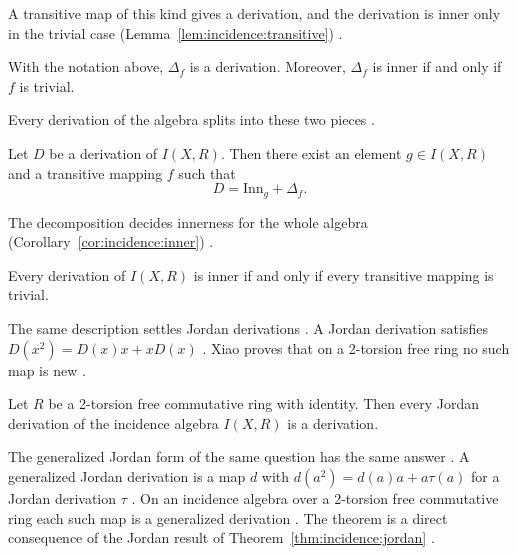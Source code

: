 A transitive map of this kind gives a derivation, and the derivation is inner only
in the trivial case (Lemma~\ref{lem:incidence:transitive}) \cite[p.~1362]{Xiao2015}.

\begin{lemma}\label{lem:incidence:transitive}
With the notation above, $\Delta_{f}$ is a derivation. Moreover, $\Delta_{f}$ is
inner if and only if $f$ is trivial.
\end{lemma}

Every derivation of the algebra splits into these two pieces
\cite[p.~1362]{Xiao2015}.

\begin{proposition}\label{prop:incidence:split}
Let $D$ be a derivation of $I(X,R)$. Then there exist an element $g\in I(X,R)$ and a
transitive mapping $f$ such that
\begin{equation*}
D=\mathrm{Inn}_{g}+\Delta_{f}.
\end{equation*}
\end{proposition}

The decomposition decides innerness for the whole algebra (Corollary~\ref{cor:incidence:inner})
\cite[p.~1363]{Xiao2015}.\begin{corollary}\label{cor:incidence:inner}
Every derivation of $I(X,R)$ is inner if and only if every transitive mapping is
trivial.
\end{corollary}

The same description settles Jordan derivations \cite[p.~1364]{Xiao2015}. A Jordan
derivation satisfies $D(x^{2})=D(x)x+xD(x)$ \cite[p.~1357]{Xiao2015}. Xiao proves
that on a 2-torsion free ring no such map is new \cite[p.~1366]{Xiao2015}.

\begin{theorem}\label{thm:incidence:jordan}
Let $R$ be a 2-torsion free commutative ring with identity. Then every Jordan
derivation of the incidence algebra $I(X,R)$ is a derivation.
\end{theorem}

The generalized Jordan form of the same question has the same answer
\cite[p.~6]{FerreiraPierinFerreira2018}. A generalized Jordan derivation is a
map $d$ with $d(a^{2})=d(a)a+a\tau(a)$ for a Jordan derivation $\tau$
\cite[p.~1]{FerreiraPierinFerreira2018}. On an incidence algebra over a
2-torsion free commutative ring each such map is a generalized derivation
\cite[Theorem~2.1, p.~6]{FerreiraPierinFerreira2018}. The theorem is a direct
consequence of the Jordan result of
Theorem~\ref{thm:incidence:jordan} \cite[p.~1]{FerreiraPierinFerreira2018}.

